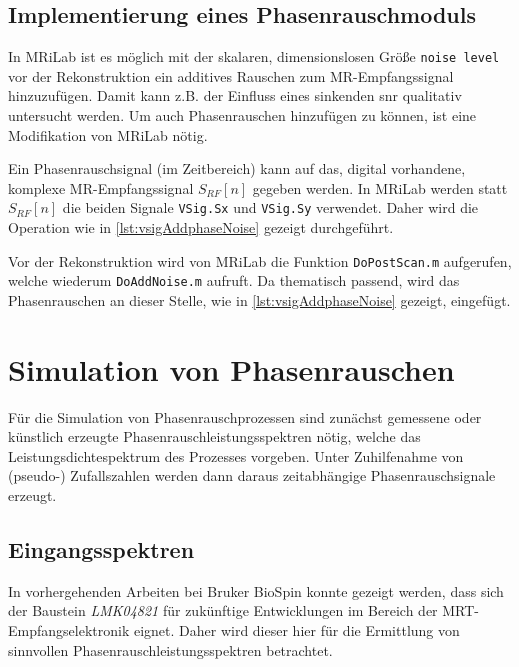\subsection{Implementierung eines Phasenrauschmoduls}
In MRiLab ist es möglich mit der skalaren, dimensionslosen Größe \texttt{noise level} vor der Rekonstruktion ein additives Rauschen zum MR-Empfangssignal hinzuzufügen. Damit kann z.B. der Einfluss eines sinkenden \gls{snr} qualitativ untersucht werden. Um auch Phasenrauschen hinzufügen zu können, ist eine Modifikation von MRiLab nötig.

Ein Phasenrauschsignal (im Zeitbereich) kann auf das, digital vorhandene, komplexe MR-Empfangssignal $S_{RF}[n]$ gegeben werden. In MRiLab werden statt $S_{RF}[n]$ die beiden Signale \texttt{VSig.Sx} und \texttt{VSig.Sy} verwendet. Daher wird die Operation wie in \autoref{lst:vsigAddphaseNoise} gezeigt durchgeführt.

Vor der Rekonstruktion wird von MRiLab die Funktion \texttt{DoPostScan.m} aufgerufen, welche wiederum \texttt{DoAddNoise.m} aufruft. Da thematisch passend, wird das Phasenrauschen an dieser Stelle, wie in \autoref{lst:vsigAddphaseNoise} gezeigt, eingefügt.










\section{Simulation von Phasenrauschen}
Für die Simulation von Phasenrauschprozessen sind zunächst gemessene oder künstlich erzeugte Phasenrauschleistungsspektren nötig, welche das Leistungsdichtespektrum des Prozesses vorgeben. Unter Zuhilfenahme von (pseudo-) Zufallszahlen werden dann daraus zeitabhängige Phasenrauschsignale erzeugt.

\subsection{Eingangsspektren}
\label{subsec:Eingangsspektren}
In vorhergehenden Arbeiten bei Bruker BioSpin konnte gezeigt werden, dass sich der Baustein \textit{LMK04821} für zukünftige Entwicklungen im Bereich der MRT-Empfangselektronik eignet. Daher wird dieser hier für die Ermittlung von sinnvollen Phasenrauschleistungsspektren betrachtet.


